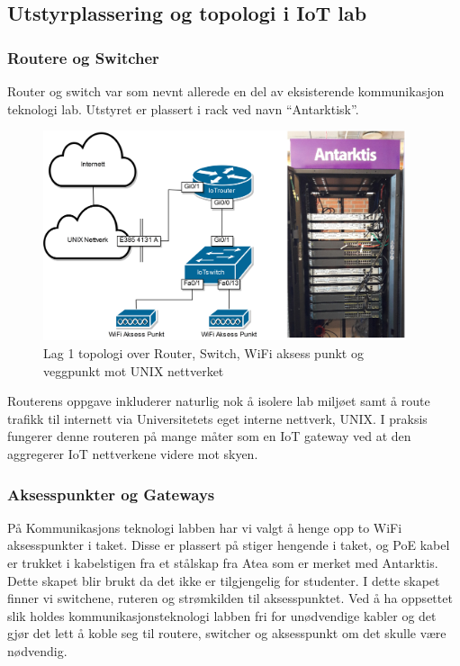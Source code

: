 \documentclass{article}
\begin{document}
\subsection{Utstyrplassering og topologi i IoT lab}
\subsubsection{Routere og Switcher}
Router og switch var som nevnt allerede en del av eksisterende kommunikasjon teknologi lab. Utstyret er plassert i rack ved navn “Antarktisk”. 

\begin{figure}[!ht]
  \centering
      \includegraphics[width=0.95\textwidth]{IoTlabtopologiRouterSwitch}
  \caption{Lag 1 topologi over Router, Switch, WiFi aksess punkt og veggpunkt mot UNIX nettverket}
\end{figure}

Routerens oppgave inkluderer naturlig nok å isolere lab miljøet samt å route trafikk til internett via Universitetets eget interne nettverk, UNIX. I praksis fungerer denne routeren på mange måter som en IoT gateway ved at den aggregerer IoT nettverkene videre mot skyen\cite{iotiot}. 

\subsubsection{Aksesspunkter og Gateways}
På Kommunikasjons teknologi labben har vi valgt å henge opp to WiFi aksesspunkter i taket. Disse er plassert på stiger hengende i taket, og PoE kabel er trukket i kabelstigen fra et stålskap fra Atea som er merket med Antarktis. Dette skapet blir brukt da det ikke er tilgjengelig for studenter. I dette skapet finner vi switchene, ruteren og strømkilden til aksesspunktet. Ved å ha oppsettet slik holdes kommunikasjonsteknologi labben fri for unødvendige kabler og det gjør det lett å koble seg til routere, switcher og aksesspunkt om det skulle være nødvendig. 
\end{document}
